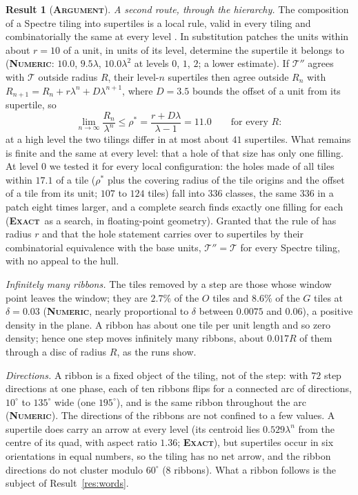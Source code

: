 \documentclass[11pt]{article}
\newcommand{\exact}{\textbf{\textsc{Exact}}}
\newcommand{\numeric}{\textbf{\textsc{Numeric}}}
\newcommand{\argu}{\textbf{\textsc{Argument}}}
\theoremstyle{definition}
\newtheorem{result}{Result}
\begin{document}
\begin{result}[\argu]
\emph{A second route, through the hierarchy.} The composition of a Spectre tiling into supertiles is a local rule, valid in every tiling and combinatorially the same at every level \cite{smith2023}. In substitution patches the units within about $r=10$ of a unit, in units of its level, determine the supertile it belongs to (\numeric: $10.0$, $9.5\lambda$, $10.0\lambda^2$ at levels $0$, $1$, $2$; a lower estimate). If $\mathcal{T}''$ agrees with $\mathcal{T}$ outside radius $R$, their level-$n$ supertiles then agree outside $R_n$ with $R_{n+1}=R_n+r\lambda^n+D\lambda^{n+1}$, where $D=3.5$ bounds the offset of a unit from its supertile, so
\begin{equation}\label{eq:confine}
\lim_{n\to\infty}\frac{R_n}{\lambda^n}\le\rho^*=\frac{r+D\lambda}{\lambda-1}=11.0 \qquad\text{for every } R:
\end{equation}
at a high level the two tilings differ in at most about $41$ supertiles. What remains is finite and the same at every level: that a hole of that size has only one filling. At level $0$ we tested it for every local configuration: the holes made of all tiles within $17.1$ of a tile ($\rho^*$ plus the covering radius of the tile origins and the offset of a tile from its unit; $107$ to $124$ tiles) fall into $336$ classes, the same $336$ in a patch eight times larger, and a complete search finds exactly one filling for each (\exact\ as a search, in floating-point geometry). Granted that the rule of \cite{smith2023} has radius $r$ and that the hole statement carries over to supertiles by their combinatorial equivalence with the base units, $\mathcal{T}''=\mathcal{T}$ for every Spectre tiling, with no appeal to the hull.

\emph{Infinitely many ribbons.} The tiles removed by a step are those whose window point leaves the window; they are $2.7\%$ of the $O$ tiles and $8.6\%$ of the $G$ tiles at $\delta=0.03$ (\numeric, nearly proportional to $\delta$ between $0.0075$ and $0.06$), a positive density in the plane. A ribbon has about one tile per unit length and so zero density; hence one step moves infinitely many ribbons, about $0.017R$ of them through a disc of radius $R$, as the runs show.

\emph{Directions.} A ribbon is a fixed object of the tiling, not of the step: with $72$ step directions at one phase, each of ten ribbons flips for a connected arc of directions, $10^\circ$ to $135^\circ$ wide (one $195^\circ$), and is the same ribbon throughout the arc (\numeric). The directions of the ribbons are not confined to a few values. A supertile does carry an arrow at every level (its centroid lies $0.529\lambda^n$ from the centre of its quad, with aspect ratio $1.36$; \exact), but supertiles occur in six orientations in equal numbers, so the tiling has no net arrow, and the ribbon directions do not cluster modulo $60^\circ$ ($8$ ribbons). What a ribbon follows is the subject of Result~\ref{res:words}.
\end{result}
\end{document}
